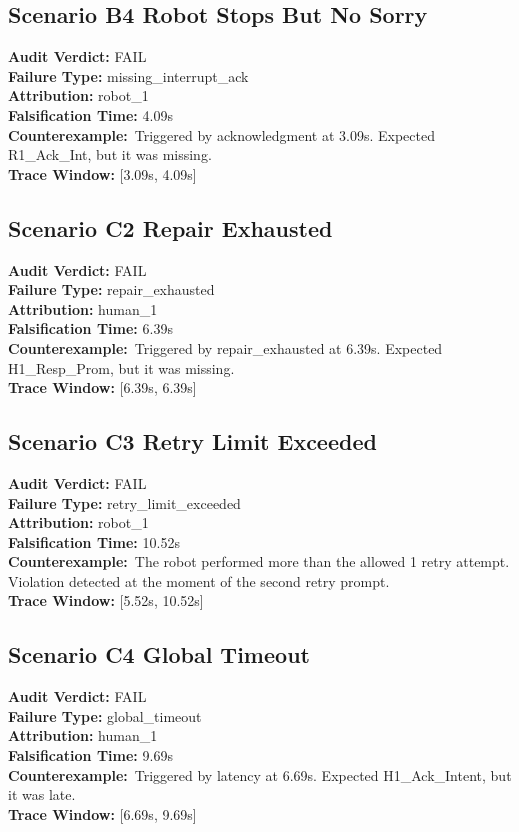 \documentclass[10pt, letterpaper]{article}
\begin{document}
\subsection{Scenario B4 Robot Stops But No Sorry}
\textbf{Audit Verdict:} FAIL \\
\textbf{Failure Type:} missing\_interrupt\_ack \\
\textbf{Attribution:} robot\_1 \\
\textbf{Falsification Time:} 4.09s \\
\textbf{Counterexample:}\ Triggered by acknowledgment at 3.09s. Expected R1\_Ack\_Int, but it was missing. \\
\textbf{Trace Window:} [3.09s, 4.09s]

\subsection{Scenario C2 Repair Exhausted}
\textbf{Audit Verdict:} FAIL \\
\textbf{Failure Type:} repair\_exhausted \\
\textbf{Attribution:} human\_1 \\
\textbf{Falsification Time:} 6.39s \\
\textbf{Counterexample:}\ Triggered by repair\_exhausted at 6.39s. Expected H1\_Resp\_Prom, but it was missing. \\
\textbf{Trace Window:} [6.39s, 6.39s]

\subsection{Scenario C3 Retry Limit Exceeded}
\textbf{Audit Verdict:} FAIL \\
\textbf{Failure Type:} retry\_limit\_exceeded \\
\textbf{Attribution:} robot\_1 \\
\textbf{Falsification Time:} 10.52s \\
\textbf{Counterexample:}\ The robot performed more than the allowed 1 retry attempt. Violation detected at the moment of the second retry prompt. \\
\textbf{Trace Window:} [5.52s, 10.52s]

\subsection{Scenario C4 Global Timeout}
\textbf{Audit Verdict:} FAIL \\
\textbf{Failure Type:} global\_timeout \\
\textbf{Attribution:} human\_1 \\
\textbf{Falsification Time:} 9.69s \\
\textbf{Counterexample:}\ Triggered by latency at 6.69s. Expected H1\_Ack\_Intent, but it was late. \\
\textbf{Trace Window:} [6.69s, 9.69s]
\end{document}

